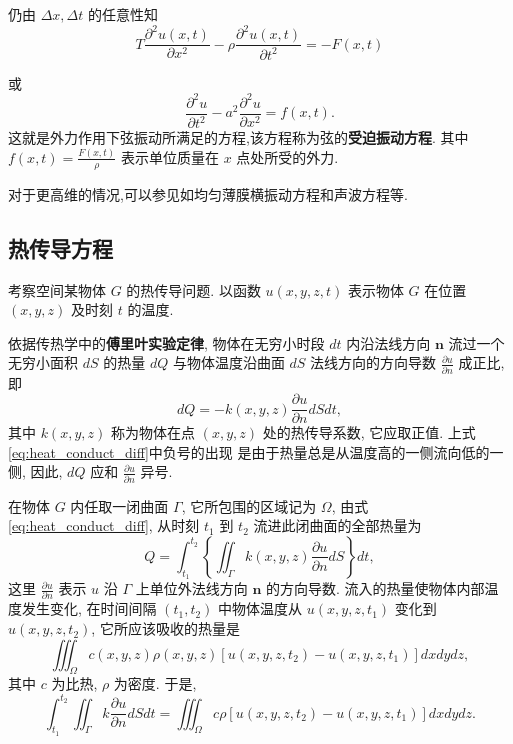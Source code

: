 仍由 $\Delta x, \Delta t$ 的任意性知
$$
T \frac{\partial^2 u(x, t)}{\partial x^2}-\rho \frac{\partial^2 u(x, t)}{\partial t^2}=-F(x, t)
$$

或
\begin{equation}
\frac{\partial^2 u}{\partial t^2}-a^2 \frac{\partial^2 u}{\partial x^2}=f(x, t) .
\label{eq:forced_vibration}
\end{equation}
这就是外力作用下弦振动所满足的方程,该方程称为弦的\textbf{受迫振动方程}.
其中 $f(x, t)=\frac{F(x, t)}{\rho}$ 表示单位质量在 $x$ 点处所受的外力.


对于更高维的情况,可以参见如均匀薄膜横振动方程和声波方程等.

\subsection{热传导方程}
考察空间某物体 $G$ 的热传导问题. 以函数 $u(x, y, z, t)$ 表示物体 $G$ 在位置 $(x, y, z)$ 
及时刻 $t$ 的温度.

依据传热学中的\textbf{傅里叶实验定律}, 物体在无穷小时段 $d t$ 内沿法线方向 $\boldsymbol{n}$ 流过一个无穷小面积 $d S$ 的热量 $d Q$ 
与物体温度沿曲面 $d S$ 法线方向的方向导数 $\frac{\partial u}{\partial n}$ 成正比, 即
\begin{equation}
d Q=-k(x, y, z) \frac{\partial u}{\partial n} d S d t,
\label{eq:heat_conduct_diff}
\end{equation}
其中 $k(x, y, z)$ 称为物体在点 $(x, y, z)$ 处的热传导系数, 它应取正值. 上式\eqref{eq:heat_conduct_diff}中负号的出现
是由于热量总是从温度高的一侧流向低的一侧, 因此, $d Q$ 应和 $\frac{\partial u}{\partial n}$ 异号.

在物体 $G$ 内任取一闭曲面 $\Gamma$, 它所包围的区域记为 $\Omega$, 由式\eqref{eq:heat_conduct_diff}, 
从时刻 $t_1$ 到 $t_2$ 流进此闭曲面的全部热量为
$$
Q=\int_{t_1}^{t_2}\left\{\iint_{\Gamma} k(x, y, z) \frac{\partial u}{\partial n} d S\right\} d t,
$$
这里 $\frac{\partial u}{\partial n}$ 表示 $u$ 沿 $\Gamma$ 上单位外法线方向 $\boldsymbol{n}$ 的方向导数.
流入的热量使物体内部温度发生变化, 在时间间隔 $\left(t_1, t_2\right)$ 中物体温度从 $u(x, y, z,  t_1 )$ 变化到 $u\left(x, y, z, t_2\right)$, 它所应该吸收的热量是
$$
\iiint_{\Omega} c(x, y, z) \rho(x, y, z)\left[u\left(x, y, z, t_2\right)-u\left(x, y, z, t_1\right)\right] d x d y d z,
$$
其中 $c$ 为比热, $\rho$ 为密度. 于是,
$$
    \int_{t_1}^{t_2} \iint_{\Gamma} k \frac{\partial u}{\partial n} d S d t=
    \iiint_{\Omega} c \rho\left[u\left(x, y, z, t_2\right)-u\left(x, y, z, t_1\right)\right] d x d y d z . 
$$

